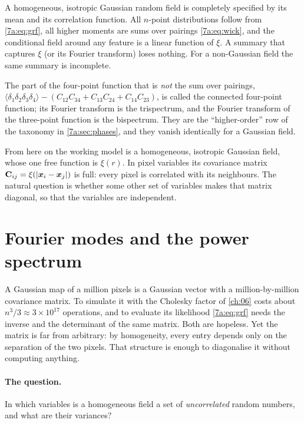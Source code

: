 \begin{keyidea}
A homogeneous, isotropic Gaussian random field is completely specified by its
mean and its correlation function. All $n$-point distributions follow from
\eqref{7a:eq:grf}, all higher moments are sums over pairings
\eqref{7a:eq:wick}, and the conditional field around any feature is a linear
function of $\xi$. A summary that captures $\xi$ (or its Fourier transform)
loses nothing. For a non-Gaussian field the same summary is incomplete.
\end{keyidea}

The part of the four-point function that is \emph{not} the sum over pairings,
$\langle\delta_1\delta_2\delta_3\delta_4\rangle-(C_{12}C_{34}+C_{13}C_{24}+C_{14}C_{23})$,
is called the connected four-point function; its Fourier transform is the
trispectrum, and the Fourier transform of the three-point function is the
bispectrum. They are the ``higher-order'' row of the taxonomy in
\cref{7a:sec:phases}, and they vanish identically for a Gaussian field.

From here on the working model is a homogeneous, isotropic Gaussian field, whose
one free function is $\xi(r)$. In pixel variables its covariance matrix
$\mathbf{C}_{ij}=\xi(|\bm x_i-\bm x_j|)$ is full: every pixel is correlated with its
neighbours. The natural question is whether some other set of variables makes
that matrix diagonal, so that the variables are independent.
\section{Fourier modes and the power spectrum}
\label{7a:sec:fourier}

A Gaussian map of a million pixels is a Gaussian vector with a million-by-million
covariance matrix. To simulate it with the Cholesky factor of \cref{ch:06} costs
about $n^3/3\approx3\times10^{17}$ operations, and to evaluate its likelihood
\eqref{7a:eq:grf} needs the inverse and the determinant of the same matrix. Both
are hopeless. Yet the matrix is far from arbitrary: by homogeneity, every entry
depends only on the separation of the two pixels. That structure is enough to
diagonalise it without computing anything.

\paragraph{The question.} In which variables is a homogeneous field a set of
\emph{uncorrelated} random numbers, and what are their variances?

